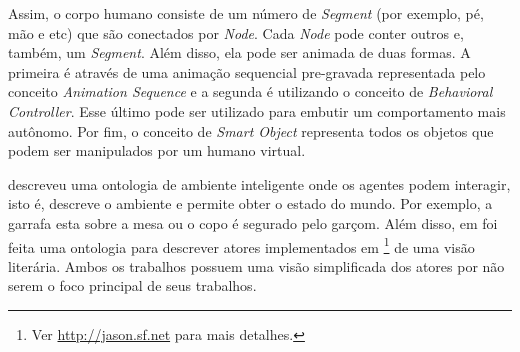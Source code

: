Assim, o corpo humano consiste de um número de \emph{Segment} (por exemplo,
pé, mão e etc) que são conectados por \emph{Node}. Cada \emph{Node} pode
conter outros e, também, um \emph{Segment}. Além disso, ela pode ser animada
de duas formas. A primeira é através de uma animação sequencial pre-gravada
representada pelo conceito \emph{Animation Sequence} e a segunda é utilizando
o conceito de \emph{Behavioral Controller}. Esse último pode ser utilizado
para embutir um comportamento mais autônomo. Por fim, o conceito de
\emph{Smart Object} representa todos os objetos que podem ser manipulados por
um humano virtual.

\citet{grimaldo2006ontology} descreveu uma ontologia de ambiente inteligente
onde os agentes podem interagir, isto é, descreve o ambiente e permite
obter o estado do mundo. Por exemplo, a garrafa esta sobre a mesa ou o copo é
segurado pelo garçom. Além disso, em \citet{muller2010amabid} foi feita uma
ontologia para descrever atores implementados em \jason\footnote{Ver
\url{http://jason.sf.net} para mais detalhes.} de uma visão literária. Ambos
os trabalhos possuem uma visão simplificada dos atores por não serem o foco
principal de seus trabalhos.

